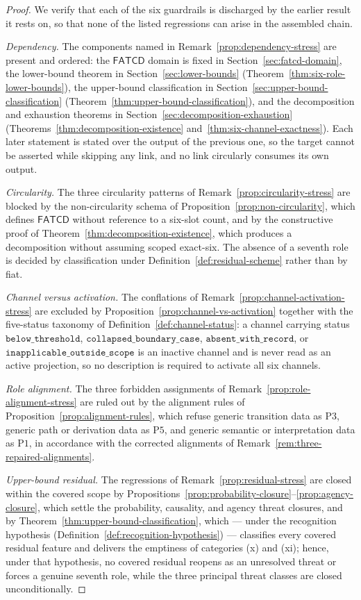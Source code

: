\documentclass[11pt]{article}
\theoremstyle{definition}
\newcommand{\FATCD}{\ensuremath{\mathsf{FATCD}}}
\newcommand{\belowthr}{\texttt{below\_threshold}}
\newcommand{\collapsedbc}{\texttt{collapsed\_boundary\_case}}
\newcommand{\absentrec}{\texttt{absent\_with\_record}}
\newcommand{\outsidescope}{\texttt{inapplicable\_outside\_scope}}
\newcommand{\Pone}{\ensuremath{\mathrm{P1}}}
\newcommand{\Pthree}{\ensuremath{\mathrm{P3}}}
\newcommand{\Pfive}{\ensuremath{\mathrm{P5}}}
\begin{document}
\begin{proof}
We verify that each of the six guardrails is discharged by the earlier
result it rests on, so that none of the listed regressions can arise in
the assembled chain.

\emph{Dependency.} The components named in
Remark~\ref{prop:dependency-stress} are present and ordered: the
\FATCD{} domain is fixed in Section~\ref{sec:fatcd-domain}, the
lower-bound theorem in Section~\ref{sec:lower-bounds}
(Theorem~\ref{thm:six-role-lower-bounds}), the upper-bound
classification in Section~\ref{sec:upper-bound-classification}
(Theorem~\ref{thm:upper-bound-classification}), and the
decomposition and exhaustion theorems in
Section~\ref{sec:decomposition-exhaustion}
(Theorems~\ref{thm:decomposition-existence}
and~\ref{thm:six-channel-exactness}). Each later statement is stated
over the output of the previous one, so the target cannot be asserted
while skipping any link, and no link circularly consumes its own
output.

\emph{Circularity.} The three circularity patterns of
Remark~\ref{prop:circularity-stress} are blocked by the
non-circularity schema of Proposition~\ref{prop:non-circularity}, which
defines \FATCD{} without reference to a six-slot count, and by the
constructive proof of Theorem~\ref{thm:decomposition-existence}, which
produces a decomposition without assuming scoped exact-six. The absence
of a seventh role is decided by classification under
Definition~\ref{def:residual-scheme} rather than by fiat.

\emph{Channel versus activation.} The conflations of
Remark~\ref{prop:channel-activation-stress} are excluded by
Proposition~\ref{prop:channel-vs-activation} together with the
five-status taxonomy of Definition~\ref{def:channel-status}: a channel
carrying status \(\belowthr\), \(\collapsedbc\), \(\absentrec\), or
\(\outsidescope\) is an inactive channel and is never read as an active
projection, so no description is required to activate all six channels.

\emph{Role alignment.} The three forbidden assignments of
Remark~\ref{prop:role-alignment-stress} are ruled out by the alignment
rules of Proposition~\ref{prop:alignment-rules}, which refuse generic
transition data as \Pthree{}, generic path or derivation data as
\Pfive{}, and generic semantic or interpretation data as \Pone{}, in
accordance with the corrected alignments of
Remark~\ref{rem:three-repaired-alignments}.

\emph{Upper-bound residual.} The regressions of
Remark~\ref{prop:residual-stress} are closed within the covered scope by
Propositions~\ref{prop:probability-closure}--\ref{prop:agency-closure},
which settle the probability, causality, and agency threat closures, and
by Theorem~\ref{thm:upper-bound-classification}, which --- under the
recognition hypothesis (Definition~\ref{def:recognition-hypothesis}) ---
classifies every covered residual feature and delivers the emptiness of
categories (x) and (xi); hence, under that hypothesis, no covered residual
reopens as an unresolved threat or forces a genuine seventh role, while the
three principal threat classes are closed unconditionally.


\end{proof}
\end{document}
